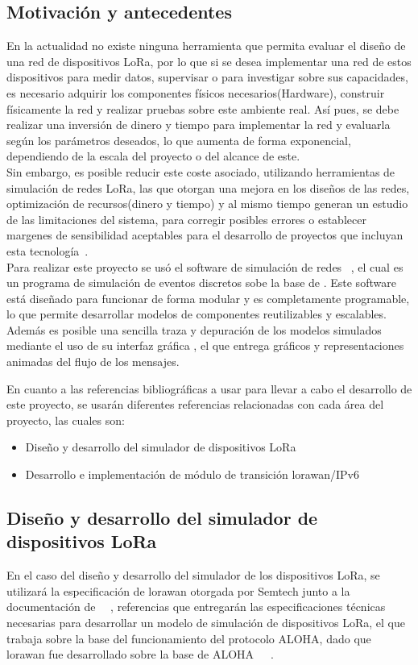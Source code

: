 \begin{justify}
\section{Motivación y antecedentes}
En la actualidad no existe ninguna herramienta que permita evaluar el diseño de una red de dispositivos LoRa, por lo que si se desea implementar una red de estos dispositivos para medir datos, supervisar o para investigar sobre sus capacidades, es necesario adquirir los componentes físicos necesarios(Hardware), construir físicamente la red y realizar pruebas sobre este ambiente real. Así pues, se debe realizar una inversión de dinero y tiempo para implementar la red y evaluarla según los parámetros deseados, lo que aumenta de forma exponencial, dependiendo de la escala del proyecto o del alcance de este.\\
Sin embargo, es posible reducir este coste asociado, utilizando herramientas de simulación de redes LoRa, las que otorgan una mejora en los diseños de las redes, optimización de recursos(dinero y tiempo) y al mismo tiempo generan un estudio de las limitaciones del sistema, para corregir posibles errores o establecer margenes de sensibilidad aceptables para el desarrollo de proyectos que incluyan esta tecnología~\cite{Xavier}.\\ 
Para realizar este proyecto se usó el software de simulación de redes \OMNET ~\cite{Omnet++}, el cual es un programa de simulación de eventos discretos sobe la base de \CC. Este software está diseñado para funcionar de forma modular y es completamente programable, lo que permite desarrollar modelos de componentes reutilizables y escalables. Además es posible una sencilla traza y depuración de los modelos simulados mediante el uso de su interfaz gráfica , el que entrega gráficos y representaciones animadas del flujo de los mensajes.

En cuanto a las referencias bibliográficas a usar para llevar a cabo el desarrollo de este proyecto, se usarán diferentes referencias relacionadas con cada área del proyecto, las cuales son: 
\begin{itemize}
\item Diseño y desarrollo del simulador de dispositivos LoRa
\item Desarrollo e implementación de módulo de transición \gls{lorawan}/IPv6
\end{itemize}
\subsection{Diseño y desarrollo del simulador de dispositivos LoRa}
En el caso del diseño y desarrollo del simulador de los dispositivos LoRa, se utilizará la especificación de \gls{lorawan} otorgada por Semtech junto a la documentación de \OMNET ~\cite{Sornin}~\cite{Sornin2}, referencias que entregarán las especificaciones técnicas necesarias para  desarrollar un modelo de simulación de dispositivos LoRa, el que trabaja sobre la base del funcionamiento del protocolo ALOHA, dado que \gls{lorawan} fue desarrollado sobre la base de ALOHA~\cite{Sornin}~\cite{Abdullah}~\cite{NORMAN}. 

\end{justify}
